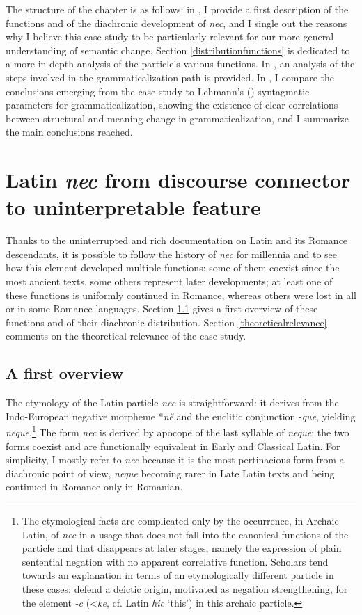 \documentclass[output=paper,modfonts,nonflat,citecolor=brown,
showindex
]{langsci/langscibook}
\begin{document}
The structure of the chapter is as follows: in , I provide a first description of the functions and of the diachronic development of {\emph{nec}}, and I single out the reasons why I believe this case study to be particularly relevant for our more general understanding of semantic change. Section \ref{distributionfunctions} is dedicated to a more in-depth analysis of the particle's various functions. In , an analysis of the steps involved in the grammaticalization path is provided. In , I compare the  conclusions emerging from the case study to Lehmann's (\citeyear{Lehmann15}) syntagmatic parameters for grammaticalization, showing the existence of clear correlations between structural and meaning change in grammaticalization, and I summarize the main conclusions reached. 

\section{Latin {\emph{nec}} from discourse connector to uninterpretable feature} \label{generalintro}

Thanks to the uninterrupted and rich documentation on Latin and its Romance descendants, it is possible to follow the history of {\emph{nec}} for millennia and to see how this element developed multiple functions: some of them coexist since the most ancient texts, some others represent later developments; at least one of these functions is uniformly continued in Romance, whereas others were lost in all or in some Romance languages. Section \ref{corefacts} gives a first overview of these functions and of their diachronic distribution. Section \ref{theoreticalrelevance} comments on the theoretical relevance of the case study.
 

\subsection{A first overview} \label{corefacts}

The etymology of the Latin particle {\emph{nec}} is straightforward: it derives from the Indo-European negative morpheme *{\emph{n\u{e}}} and the enclitic conjunction -{\emph{que}}, yielding {\emph{neque}}.{\footnote{The etymological facts are complicated only by the occurrence, in Archaic Latin, of {\emph{nec}} in a usage that does not fall into the canonical functions of the particle and that disappears at later stages, namely the expression of plain sentential negation with no apparent correlative function. Scholars tend towards an explanation in terms of an etymologically different particle in these cases: \citet[29---30]{OrlandiniPoccetti07} defend a deictic origin, motivated as negation strengthening, for the element {\emph{-c}} (\textless *{\emph{ke}}, cf. Latin {\emph{hic}} `this') in this archaic particle.}} The form {\emph{nec}} is derived by apocope of the last syllable of {\emph{neque}}: the two forms coexist and are functionally equivalent in Early and Classical Latin. For simplicity, I mostly refer to {\emph{nec}} because it is the most pertinacious form from a diachronic point of view, {\emph{neque}} becoming rarer in Late Latin texts and being continued in Romance only in Romanian.
\end{document}

